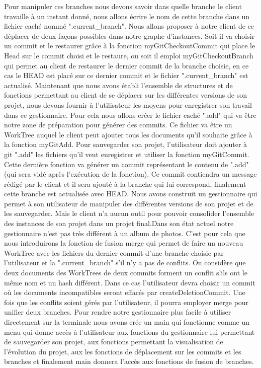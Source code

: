 \documentclass[11pt,francais]{article}
\begin{document}
	Pour manipuler ces branches nous devons savoir dans quelle branche le client travaille à un instant donné, nous allons écrire le nom de cette branche dans un fichier caché nommé  ".current\_branch". Nous allons proposer à notre client de ce déplacer de deux façons possibles dans notre graphe d’instances. Soit il va choisir un commit et le restaurer grâce à la fonction myGitCheckoutCommit qui place le Head sur le commit choisi et le restaure, ou soit il emploi myGitCheckoutBranch qui permet au client de restaurer le dernier commit de la branche choisie, en ce cas le HEAD est placé sur ce dernier commit et le fichier ".current\_branch" est actualisé. \newline \newline
	Maintenant que nous avons établi l’ensemble de structures et de fonctions permettant au client de se déplacer sur les différentes versions de son projet, nous devons fournir à l’utilisateur les moyens pour enregistrer son travail dans ce gestionnaire. Pour cela nous allons créer le fichier caché ".add" qui va être notre zone de préparation pour générer des commits. Ce fichier va être un WorkTree auquel le client peut ajouter tous les documents qu’il souhaite grâce à la fonction myGitAdd.  Pour sauvegarder son projet, l'utilisateur doit ajouter à git ".add" les fichiers qu'il veut enregistrer et utiliser la fonction myGitCommit. Cette dernière fonction va générer un commit représentant le contenu de ".add" (qui sera vidé après l’exécution de la fonction). Ce commit contiendra un message rédigé par le client et il sera ajouté à la branche qui lui correspond, finalement cette branche est actualisée avec HEAD.\newline \newline
	Nous avons construit un gestionnaire qui permet à son utilisateur de manipuler des différentes versions de son projet et de les sauvegarder. Mais le client n'a aucun outil pour pouvoir consolider  l'ensemble des instances de son projet dans un projet final.Dans son état actuel notre gestionnaire n’est pas très différent à un album de photos. C’est pour cela que nous introduirons la fonction de fusion merge qui permet de faire un nouveau WorkTree avec les fichiers du dernier commit d’une branche choisie par l’utilisateur et la ".current\_branch" s’il n’y a pas de conflits. On considère que deux documents des WorkTrees de deux commits forment un conflit s’ils ont le même nom et un hash différent. Dans ce cas l’utilisateur devra choisir un commit  où les documents incompatibles seront effacés par createDeletionCommit. Une fois que les conflits soient gérés par l’utilisateur, il pourra employer merge pour unifier deux branches.
	Pour rendre notre gestionnaire plus facile à utiliser directement sur la terminale nous avons crée un main qui fonctionne comme un menu qui donne accès à l’utilisateur aux fonctions du gestionnaire lui permettant de sauvegarder son projet, aux fonctions permettant la  visualisation de l’évolution du projet, aux les fonctions de déplacement sur les commits et les branches et finalement main donnera l’accès aux fonctions de fusion de branches. 	
\end{document}
